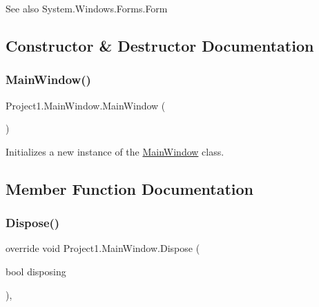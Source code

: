 \begin{DoxySeeAlso}{See also}
System.\+Windows.\+Forms.\+Form


\end{DoxySeeAlso}


\subsection{Constructor \& Destructor Documentation}
\mbox{\label{class_project1_1_1_main_window_ac8ada21cf001233b859c3c8fd34dbd14}} 
\subsubsection{\texorpdfstring{Main\+Window()}{MainWindow()}}
{\footnotesize\ttfamily Project1.\+Main\+Window.\+Main\+Window (\begin{DoxyParamCaption}{ }\end{DoxyParamCaption})\hspace{0.3cm}{\ttfamily [inline]}}



Initializes a new instance of the \hyperlink{class_project1_1_1_main_window}{Main\+Window} class. 



\subsection{Member Function Documentation}
\mbox{\label{class_project1_1_1_main_window_a6a752bcb31d44385e4f21b1e75861615}} 
\subsubsection{\texorpdfstring{Dispose()}{Dispose()}}
{\footnotesize\ttfamily override void Project1.\+Main\+Window.\+Dispose (\begin{DoxyParamCaption}\item[{bool}]{disposing }\end{DoxyParamCaption})\hspace{0.3cm}{\ttfamily [inline]}, {\ttfamily [protected]}}



